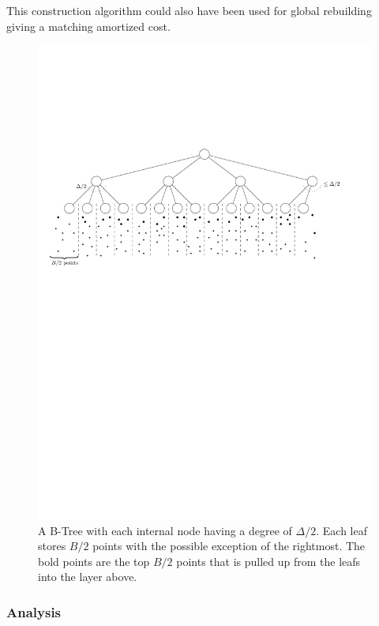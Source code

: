\documentclass[twoside,11pt,openright]{report}
\begin{document}
This construction algorithm could also have been used for global rebuilding giving a matching amortized cost.

\begin{figure}
	\centering
	\includegraphics[width=\textwidth]{../figures/gerth_construction}
	\caption{A B-Tree with each internal node having a degree of $\Delta/2$. Each leaf stores $B/2$ points with the possible exception of the rightmost. The bold points are the top $B/2$ points that is pulled up from the leafs into the layer above.}
	\label{fig:gerth_construction}
\end{figure}

\subsubsection*{Analysis}
\end{document}
